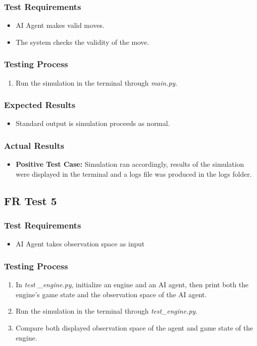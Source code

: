 \documentclass[12pt, titlepage]{article}
\begin{document}
\subsubsection{Test Requirements}
\begin{itemize}
    \item AI Agent makes valid moves.
    \item The system checks the validity of the move.
\end{itemize}
\subsubsection{Testing Process}
\begin{enumerate}
    \item Run the simulation in the terminal through \textit{main.py}.
\end{enumerate}
\subsubsection{Expected Results}
\begin{itemize}
    \item Standard output is simulation proceeds as normal.
\end{itemize}
\subsubsection{Actual Results}
\begin{itemize}
    \item \textbf{Positive Test Case:} Simulation ran accordingly, results of the simulation were displayed in the terminal and a logs file was produced in the logs folder.
\end{itemize}

\subsection{FR Test 5}
\subsubsection{Test Requirements}
\begin{itemize}
    \item AI Agent takes observation space as input
\end{itemize}
\subsubsection{Testing Process}
\begin{enumerate}
    \item In \textit{test
    \_engine.py}, initialize an engine and an AI agent, then print both the engine's game state and the observation space of the AI agent.
    \item Run the simulation in the terminal through \textit{test\_engine.py}.
    \item Compare both displayed observation space of the agent and game state of the engine.
\end{enumerate}
\end{document}
